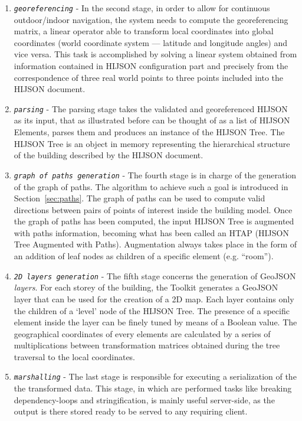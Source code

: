 \begin{enumerate}
\item
 \textit{\texttt{georeferencing}} - In the second stage, in order to allow
 for continuous outdoor/indoor navigation, the system needs to compute
 the georeferencing matrix, a linear operator able to transform local
 coordinates into global coordinates (world coordinate
 system --- latitude and longitude angles) and vice versa. This task is
 accomplished by solving a linear system obtained from information
 contained in HIJSON configuration part and precisely from the
 correspondence of three real world points to three points included
 into the HIJSON document.
\item
 \textit{\texttt{parsing}} - The parsing stage takes the validated and
 georeferenced HIJSON as its input, that as illustrated before can be
 thought of as a list of HIJSON Elements, parses them and produces an
 instance of the HIJSON Tree. The HIJSON Tree is an object in memory
 representing the hierarchical structure of the building described
 by the HIJSON document.
\item
 \textit{\texttt{graph of paths generation}} - The fourth stage is in char\-ge
 of the generation of the graph of paths. The algorithm to achieve such a 
 goal is introduced in Section~\ref{sec:paths}. The graph of paths can be used to compute valid directions between pairs of points of
 interest inside the building model. Once the graph of paths has been computed, the
 input HIJSON Tree is augmented with paths information, becoming what
 has been called an HTAP (HIJSON Tree Augmented with Paths).
 Augmentation always takes place in the form of an addition of leaf nodes as children of a
 specific element (e.g. ``room'').
\item
 \textit{\texttt{2D layers generation}} - The fifth stage concerns the
 generation of GeoJSON \emph{layers}. For each storey of the building, the Toolkit generates a
 GeoJSON layer that can be used for the creation of a 2D map. Each layer
 contains only the children of a `level' node of the HIJSON Tree. 
 The presence of a specific element inside the layer can be finely tuned 
 by means of a Boolean value. The geographical coordinates of every elements
 are calculated by a series of multiplications between transformation matrices obtained 
 during the tree traversal to the local coordinates.
\item
 \textit{\texttt{marshalling}} - The last stage is responsible for executing
 a serialization of the the transformed data. This stage, in which are performed tasks like breaking
 dependency-loops and stringification, is
 mainly useful  server-side, as the output is there stored ready to be
 served to any requiring client.
\end{enumerate}

